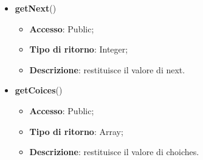 {{\begin{itemize}
			\begin{itemize}
				\item \textbf{Accesso}: Public;
				\item \textbf{Tipo di ritorno}: Integer;
				\item \textbf{Descrizione}: restituisce il valore di prev.
			\end{itemize}
			\item \textbf{getNext}()
			\begin{itemize}
				\item \textbf{Accesso}: Public;
				\item \textbf{Tipo di ritorno}: Integer;
				\item \textbf{Descrizione}: restituisce il valore di next.
			\end{itemize}
			\item \textbf{getCoices}()
			\begin{itemize}
				\item \textbf{Accesso}: Public;
				\item \textbf{Tipo di ritorno}: Array;
				\item \textbf{Descrizione}: restituisce il valore di choiches.
			\end{itemize}
		\end{itemize}
		}
}
